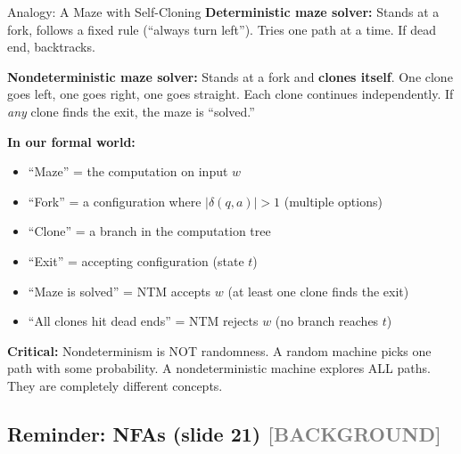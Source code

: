 \documentclass[11pt,a4paper]{article}
\newcommand{\kbg}{\textcolor{gray}{\textbf{[BACKGROUND]}}}
\begin{document}
\begin{notebox}{Analogy: A Maze with Self-Cloning}
\textbf{Deterministic maze solver:} Stands at a fork, follows a fixed rule (``always turn left''). Tries one path at a time. If dead end, backtracks.

\textbf{Nondeterministic maze solver:} Stands at a fork and \textbf{clones itself}. One clone goes left, one goes right, one goes straight. Each clone continues independently. If \textit{any} clone finds the exit, the maze is ``solved.''

\textbf{In our formal world:}
\begin{itemize}[nosep]
\item ``Maze'' = the computation on input $w$
\item ``Fork'' = a configuration where $|\delta(q, a)| > 1$ (multiple options)
\item ``Clone'' = a branch in the computation tree
\item ``Exit'' = accepting configuration (state $t$)
\item ``Maze is solved'' = NTM accepts $w$ (at least one clone finds the exit)
\item ``All clones hit dead ends'' = NTM rejects $w$ (no branch reaches $t$)
\end{itemize}

\textbf{Critical:} Nondeterminism is NOT randomness. A random machine picks one path with some probability. A nondeterministic machine explores ALL paths. They are completely different concepts.
\end{notebox}

\subsection{Reminder: NFAs (slide 21) \kbg}
\end{document}
